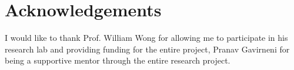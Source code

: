 
\chapter*{Acknowledgements}
I would like to thank Prof. William Wong for allowing me to participate in his research lab and providing funding for the entire project, Pranav Gavirneni for being a supportive mentor through the entire research project.